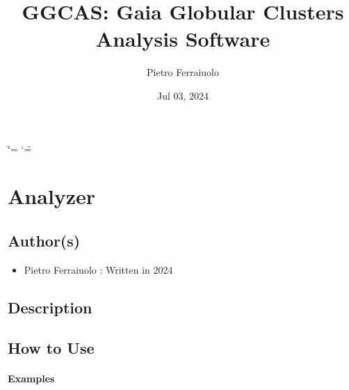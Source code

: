 \documentclass[letterpaper,10pt,english]{sphinxmanual}
\title{G\sphinxhyphen{}GCAS: Gaia Globular Clusters Analysis Software}
\date{Jul 03, 2024}
\author{Pietro Ferraiuolo}
\begin{document}
\ifdefined\shorthandoff
  \ifnum\catcode`\=\string=\active\shorthandoff{=}\fi
  \ifnum\catcode`\"=\active{}\fi
\fi

\pagestyle{empty}
\sphinxmaketitle
\pagestyle{plain}
\sphinxtableofcontents
\pagestyle{normal}
\label{\detokenize{index::doc}}


\sphinxstepscope


\chapter{Analyzer}
\label{\detokenize{analyzer:module-ggcas.analyzer}}\label{\detokenize{analyzer:analyzer}}\label{\detokenize{analyzer::doc}}

\section{Author(s)}
\label{\detokenize{analyzer:author-s}}\begin{itemize}
\item {} 
\sphinxAtStartPar
Pietro Ferraiuolo : Written in 2024

\end{itemize}


\section{Description}
\label{\detokenize{analyzer:description}}

\section{How to Use}
\label{\detokenize{analyzer:how-to-use}}\subsubsection*{Examples}
\end{document}
